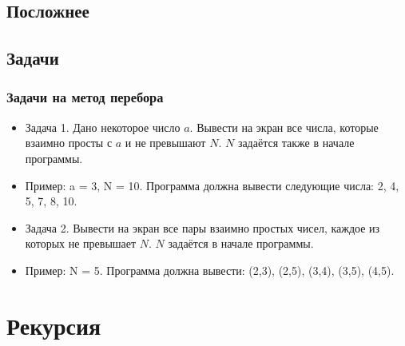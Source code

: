 \documentclass[compress,red]{beamer}
\begin{document}
\subsection{Посложнее}
\begin{frame}[fragile]
  \frametitle{Метод перебора: НОД}
  \begin{lstlisting}[label=ruby2,caption=НОД(a,b)]
    def gcd(a,b)
      max = 1
      for i in 2..a
        max = i if ((a%i==0) && (b%i==0))
      end
      max
    end

    a = 126
    b = 486
    
    puts gcd(a,b)
  \end{lstlisting}}
  
\end{frame}

\subsection{Задачи}
\begin{frame}[fragile]
  \frametitle{Задачи на метод перебора}
	\begin{itemize}
	  \item Задача 1. Дано некоторое число $a$. Вывести на экран все числа, которые взаимно просты с $a$ и не превышают $N$. $N$ задаётся также в начале программы.
	  \item Пример: a = 3, N = 10. Программа должна вывести следующие числа: 2, 4, 5, 7, 8, 10.
	  \item Задача 2. Вывести на экран все пары взаимно простых чисел, каждое из которых не превышает $N$. $N$ задаётся в начале программы.
	  \item Пример: N = 5. Программа должна вывести: (2,3), (2,5), (3,4), (3,5), (4,5).
  \end{itemize}
\end{frame}

\section{Рекурсия}
\end{document}

